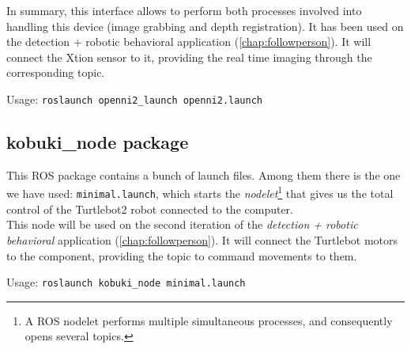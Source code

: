 		In summary, this interface allows to perform both processes involved into handling this device (image grabbing and depth registration). It has been used on the {detection + robotic behavioral} application (\autoref{chap:followperson}). It will connect the Xtion sensor to it, providing the real time imaging through the corresponding topic.\\
		
		\begin{center}
			Usage: \texttt{roslaunch openni2\_launch openni2.launch}
		\end{center}

	\subsection{kobuki\_node package}
		This ROS package contains a bunch of launch files. Among them there is the one we have used: \texttt{minimal.launch}, which starts the \emph{nodelet}\footnote{A ROS nodelet performs multiple simultaneous processes, and consequently opens several topics.} that gives us the total control of the Turtlebot2 robot connected to the computer.\\
		
		This node will be used on the second iteration of the \emph{detection + robotic behavioral} application (\autoref{chap:followperson}). It will connect the Turtlebot motors to the component, providing the topic to command movements to them.
		
		\begin{center}
			Usage: \texttt{roslaunch kobuki\_node minimal.launch}
		\end{center}

	
